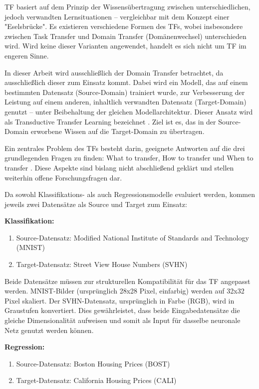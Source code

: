 TF basiert auf dem Prinzip der Wissensübertragung zwischen unterschiedlichen, jedoch verwandten 
Lernsituationen – vergleichbar mit dem Konzept einer "Eselsbrücke". Es existieren verschiedene Formen des TFs, wobei 
insbesondere zwischen Task Transfer und Domain Transfer (Domänenwechsel) unterschieden wird. Wird keine dieser Varianten 
angewendet, handelt es sich nicht um TF im engeren Sinne.

In dieser Arbeit wird ausschließlich der Domain Transfer betrachtet, da ausschließlich dieser zum Einsatz kommt. Dabei wird ein Modell, das auf 
einem bestimmten Datensatz (Source-Domain) trainiert wurde, zur Verbesserung der Leistung auf einem anderen, inhaltlich verwandten Datensatz 
(Target-Domain) genutzt – unter Beibehaltung der gleichen Modellarchitektur. Dieser Ansatz wird als Transductive Transfer Learning bezeichnet 
\cite{survey_transfer}. Ziel ist es, das in der Source-Domain erworbene Wissen auf die Target-Domain zu übertragen.

Ein zentrales Problem des TFs besteht darin, geeignete Antworten auf die drei grundlegenden Fragen zu finden: What to transfer, How 
to transfer und When to transfer \cite{survey_transfer}. Diese Aspekte sind bislang nicht abschließend geklärt und stellen weiterhin offene 
Forschungsfragen dar.

Da sowohl Klassifikations- als auch Regressionsmodelle evaluiert werden, kommen jeweils zwei Datensätze als Source und Target zum Einsatz:

\textbf{Klassifikation:}
\begin{enumerate}
    \item Source-Datensatz: Modified National Institute of Standards and Technology (MNIST) \cite{handwritten_digit}
    \item Target-Datensatz: Street View House Numbers (SVHN) \cite{house_numbers}
\end{enumerate}

Beide Datensätze müssen zur strukturellen Kompatibilität für das TF angepasst werden. MNIST-Bilder (ursprünglich 28x28 Pixel, 
einfarbig) werden auf 32x32 Pixel skaliert. Der SVHN-Datensatz, ursprünglich in Farbe (RGB), wird in Graustufen konvertiert. Dies gewährleistet, 
dass beide Eingabedatensätze die gleiche Dimensionalität aufweisen und somit als Input für dasselbe neuronale Netz genutzt werden können.

\textbf{Regression:}
\begin{enumerate}
    \item Source-Datensatz: Boston Housing Prices (BOST) \cite{Boston_housing}
    \item Target-Datensatz: California Housing Prices (CALI) \cite{California_housing}
\end{enumerate}

